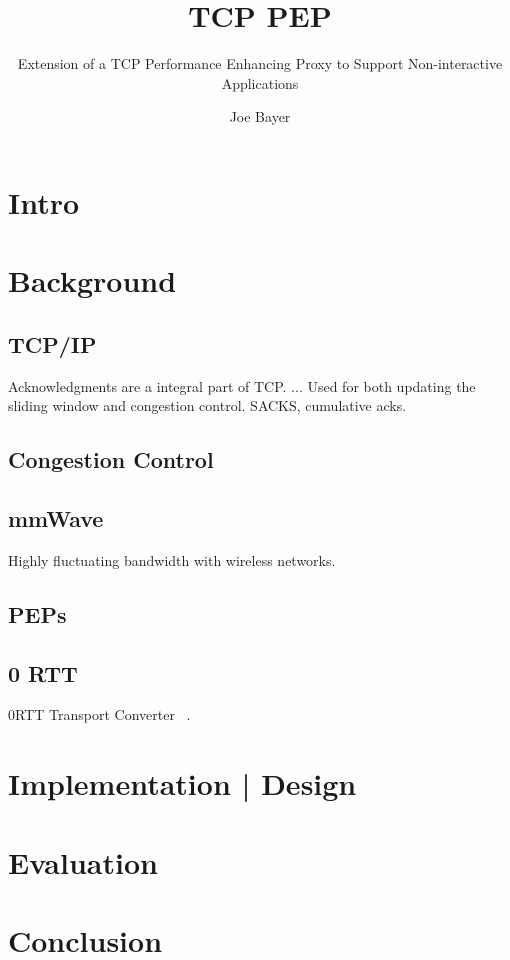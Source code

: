 \documentclass[a4paper,english, 11pt]{report}
\author{Joe Bayer}
\title{TCP PEP}
\subtitle{Extension of a TCP Performance Enhancing Proxy to
Support Non-interactive Applications}
\begin{document}
\uiomasterfp[program={Informatikk: programmering og systemarkitektur}, supervisor={Michael Welzl}]

\tableofcontents

\chapter{Intro}

\chapter{Background}

\section{TCP/IP}

Acknowledgments are a integral part of TCP. ...
Used for both updating the sliding window and congestion control. SACKS, cumulative acks.

\section{Congestion Control}

\section{mmWave}
Highly fluctuating bandwidth with wireless networks.
\section{PEPs}

\section{0 RTT}

0RTT Transport Converter ~\cite{rfc8803}.


\chapter{Implementation | Design}
\chapter{Evaluation}
\chapter{Conclusion}

{}

\end{document}
